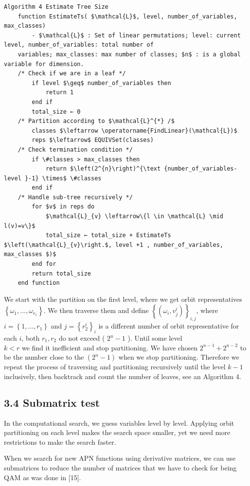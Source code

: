 \documentclass[10pt]{article}
\begin{document}
\begin{verbatim}
Algorithm 4 Estimate Tree Size
    function EstimateTs( $\mathcal{L}$, level, number_of_variables, max_classes)
        - $\mathcal{L}$ : Set of linear permutations; level: current level, number_of_variables: total number of
    variables; max_classes: max number of classes; $n$ : is a global variable for dimension.
    /* Check if we are in a leaf */
        if level $\geq$ number_of_variables then
            return 1
        end if
        total_size ← 0
    /* Partition according to $\mathcal{L}^{*} /$
        classes $\leftarrow \operatorname{FindLinear}(\mathcal{L})$
        reps $\leftarrow$ EQUIVSet(classes)
    /* Check termination condition */
        if \#classes > max_classes then
            return $\left(2^{n}\right)^{\text {number_of_variables-level }-1} \times$ \#classes
        end if
    /* Handle sub-tree recursively */
        for $v$ in reps do
            $\mathcal{L}_{v} \leftarrow\{l \in \mathcal{L} \mid l(v)=v\}$
            total_size ← total_size + EstimateTs $\left(\mathcal{L}_{v}\right.$, level +1 , number_of_variables, max_classes $)$
        end for
        return total_size
    end function
\end{verbatim}

We start with the partition on the first level, where we get orbit representatives $\left\{\omega_{1}, \ldots, \omega_{r_{1}}\right\}$. We then traverse them and define $\left\{\left(\omega_{i}, v_{j}^{i}\right)\right\}_{i, j}$, where $i=\left\{1, \ldots, r_{1}\right\}$ and $j=\left\{r_{2}^{i}\right\}_{i}$ is a different number of orbit representative for each $i$, both $r_{1}, r_{2}$ do not exceed ( $2^{n}-1$ ). Until some level\\
$k<r$ we find it inefficient and stop partitioning. We have chosen $2^{n-1}+2^{n-2}$ to be the number close to the $\left(2^{n}-1\right)$ when we stop partitioning. Therefore we repeat the process of traversing and partitioning recursively until the level $k-1$ inclusively, then backtrack and count the number of leaves, see an Algorithm 4.

\subsection*{3.4 Submatrix test}
In the computational search, we guess variables level by level. Applying orbit partitioning on each level makes the search space smaller, yet we need more restrictions to make the search faster.

When we search for new APN functions using derivative matrices, we can use submatrices to reduce the number of matrices that we have to check for being QAM as was done in [15].
\end{document}
